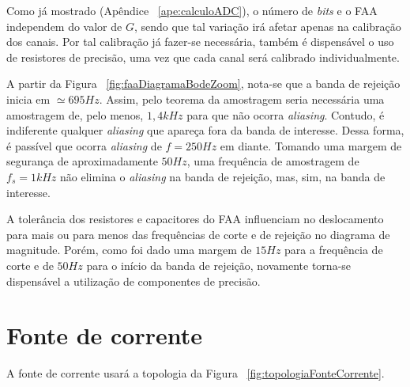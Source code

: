 \documentclass[
	12pt,				%
	openright,			%
	twoside,			%
	a4paper,			%
	english,			%
	french,				%
	spanish,			%
	brazil,				%
	]{abntex2}
\begin{document}
		Como já mostrado (Apêndice ~\ref{ape:calculoADC}), o número de \textit{bits} e o FAA independem do valor
		de $G$, sendo que tal variação irá afetar apenas na calibração dos
		canais. Por tal calibração já fazer-se necessária, também é
		dispensável o uso de resistores de precisão, uma vez que cada
		canal será calibrado individualmente.

		A partir da Figura ~\ref{fig:faaDiagramaBodeZoom}, nota-se que a banda de rejeição inicia em
		$\simeq 695Hz$. Assim, pelo teorema da amostragem seria necessária uma amostragem
		de, pelo menos, $1,4kHz$ para que não ocorra \textit{aliasing}. Contudo,
		é indiferente qualquer \textit{aliasing} que apareça fora da banda de interesse.
		Dessa forma, é passível que ocorra \textit{aliasing} de $f=250Hz$ em diante. Tomando
		uma margem de segurança de aproximadamente $50Hz$, uma frequência de amostragem
		de $f_s=1kHz$ não elimina o \textit{aliasing} na banda de rejeição, mas, sim, na banda
		de interesse.

		A tolerância dos resistores e capacitores do FAA influenciam no
		deslocamento para mais ou para menos das frequências de corte e
		de rejeição no diagrama de magnitude. Porém, como foi dado uma
		margem de $15Hz$ para a frequência de corte e de $50Hz$ para o
		início da banda de rejeição, novamente torna-se dispensável a
		utilização de componentes de precisão.
		\newpage

	\section{Fonte de corrente}

		A fonte de corrente usará a topologia da Figura ~\ref{fig:topologiaFonteCorrente}.
\end{document}
